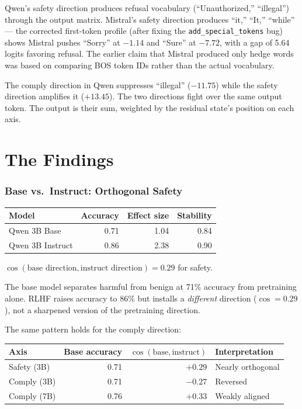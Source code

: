 \documentclass[11pt,a4paper]{article}
\begin{document}
Qwen's safety direction produces refusal vocabulary (``Unauthorized,'' ``illegal'') through the output matrix. Mistral's safety direction produces ``it,'' ``It,'' ``while'' --- the corrected first-token profile (after fixing the \texttt{add\_special\_tokens} bug) shows Mistral pushes ``Sorry'' at $-1.14$ and ``Sure'' at $-7.72$, with a gap of 5.64 logits favoring refusal. The earlier claim that Mistral produced only hedge words was based on comparing BOS token IDs rather than the actual vocabulary.

The comply direction in Qwen suppresses ``illegal'' ($-11.75$) while the safety direction amplifies it ($+13.45$). The two directions fight over the same output token. The output is their sum, weighted by the residual state's position on each axis.

\part{The Findings}

\section{Base vs.\ Instruct: Orthogonal Safety}

\begin{center}
\begin{tabular}{lrrr}
\toprule
\textbf{Model} & \textbf{Accuracy} & \textbf{Effect size} & \textbf{Stability} \\
\midrule
Qwen 3B Base & 0.71 & 1.04 & 0.84 \\
Qwen 3B Instruct & 0.86 & 2.38 & 0.90 \\
\bottomrule
\end{tabular}
\end{center}

$\cos(\text{base direction}, \text{instruct direction}) = 0.29$ for safety.

The base model separates harmful from benign at 71\% accuracy from pretraining alone. RLHF raises accuracy to 86\% but installs a \textit{different} direction ($\cos = 0.29$), not a sharpened version of the pretraining direction.

The same pattern holds for the comply direction:

\begin{center}
\begin{tabular}{lrrl}
\toprule
\textbf{Axis} & \textbf{Base accuracy} & $\cos(\text{base}, \text{instruct})$ & \textbf{Interpretation} \\
\midrule
Safety (3B) & 0.71 & $+0.29$ & Nearly orthogonal \\
Comply (3B) & 0.71 & $-0.27$ & Reversed \\
Comply (7B) & 0.76 & $+0.33$ & Weakly aligned \\
\bottomrule
\end{tabular}
\end{center}
\end{document}
